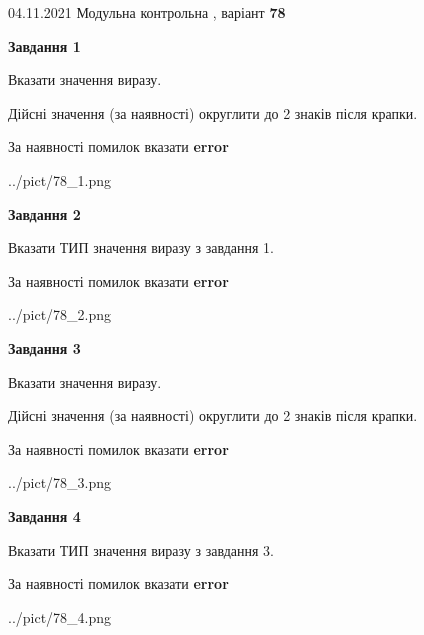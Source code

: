 \documentclass[11pt, ukrainian]{article}
\begin{document}
{04.11.2021 Модульна контрольна , варіант  \No \textbf { 78 }\par}
{
\begin {large}
{\begin {center}\textbf{Завдання 1}\end {center}}\par
Вказати значення виразу. \par
Дійсні значення (за наявності) округлити до 2 знаків після крапки. \par
За наявності помилок вказати \textbf{error}

\begin{center}
	{../pict/78_1.png}
\end{center}
\newpage

{\begin {center}\textbf{Завдання 2}\end {center}}\par
Вказати ТИП значення виразу з завдання 1. \par
За наявності помилок вказати \textbf{error}

\begin{center}
	{../pict/78_2.png}
\end{center}
\newpage

{\begin {center}\textbf{Завдання 3}\end {center}}\par
Вказати значення виразу. \par
Дійсні значення (за наявності) округлити до 2 знаків після крапки. \par
За наявності помилок вказати \textbf{error}

\begin{center}
	{../pict/78_3.png}
\end{center}
\newpage

{\begin {center}\textbf{Завдання 4}\end {center}}\par
Вказати ТИП значення виразу з завдання 3. \par
За наявності помилок вказати \textbf{error}

\begin{center}
	{../pict/78_4.png}
\end{center}
\newpage


\end{large}}
\end{document}
